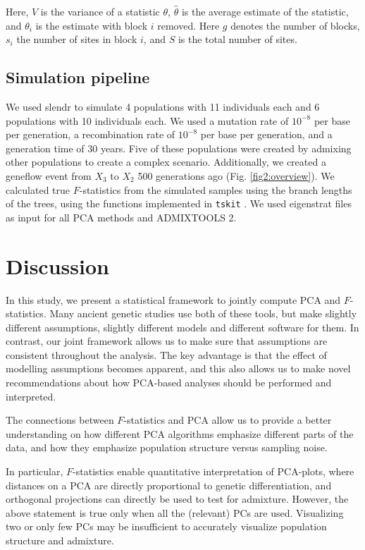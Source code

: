 \documentclass[12pt]{article}
\begin{document}
Here, $V$ is the variance of a statistic $\theta$, $\hat{\theta}$ is the average estimate of the statistic, and $\theta_i$ is the estimate with block $i$ removed. Here $g$ denotes the number of blocks, $s_i$ the number of sites in block $i$, and $S$ is the total number of sites.

\subsection{Simulation pipeline}

We used slendr \citep{petr_slendr_2022} to simulate 4 populations with 11 individuals each and 6 populations with 10 individuals each. We used a mutation rate of $10^{-8}$ per base per generation, a recombination rate of $10^{-8}$ per base per generation, and a generation time of 30 years. Five of these populations were created by admixing other populations to create a complex scenario. Additionally, we created a geneflow event from $X_3$ to $X_2$ 500 generations ago (Fig. \ref{fig2:overview}). We calculated true $F$-statistics from the simulated samples using the branch lengths of the trees, using the functions implemented in \texttt{tskit} \citep{baumdicker_efficient_2022}. We used eigenstrat files as input for all PCA methods and ADMIXTOOLS 2. 

\section{Discussion}
In this study, we present a statistical framework to jointly compute PCA and $F$-statistics. Many ancient genetic studies use both of these tools, but make slightly different assumptions, slightly different models and different software for them. In contrast, our joint framework allows us to make sure that assumptions are consistent throughout the analysis. The key advantage is that the effect of modelling assumptions becomes apparent, and this also allows us to make novel recommendations about how PCA-based analyses should be performed and interpreted.

The connections between $F$-statistics and PCA allow us to provide a better understanding on how different PCA algorithms emphasize different parts of the data, and how they emphasize population structure versus sampling noise.

In particular, $F$-statistics enable quantitative interpretation of PCA-plots, where distances on a PCA are directly proportional to genetic differentiation, and orthogonal projections can directly be used to test for admixture.
However, the above statement is true only when all the (relevant) PCs are used. Visualizing two or only few PCs may be insufficient to accurately visualize population structure and admixture. 
\end{document}

